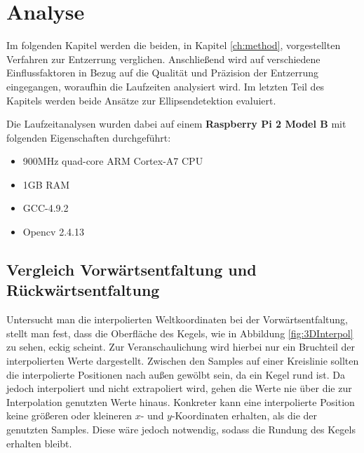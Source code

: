 \chapter{Analyse}
\label{ch:analysis}

Im folgenden Kapitel werden die beiden, in Kapitel \ref{ch:method}, vorgestellten Verfahren zur Entzerrung verglichen. Anschließend wird auf verschiedene Einflussfaktoren in Bezug auf die Qualität und Präzision der Entzerrung eingegangen, woraufhin die Laufzeiten analysiert wird. Im letzten Teil des Kapitels werden beide Ansätze zur Ellipsendetektion evaluiert.


Die Laufzeitanalysen wurden dabei auf einem \textbf{Raspberry Pi 2 Model B} mit folgenden Eigenschaften durchgeführt:
\begin{itemize}
	\item 900MHz quad-core ARM Cortex-A7 CPU
	\item 1GB RAM
	\item GCC-4.9.2
	\item Opencv 2.4.13
\end{itemize}


\section{Vergleich Vorwärtsentfaltung und Rückwärtsentfaltung}
Untersucht man die interpolierten Weltkoordinaten bei der Vorwärtsentfaltung, stellt man fest, dass die Oberfläche des Kegels,  wie in Abbildung \ref{fig:3DInterpol} zu sehen, eckig scheint. Zur Veranschaulichung wird hierbei nur ein Bruchteil der interpolierten Werte dargestellt. Zwischen den Samples auf einer Kreislinie sollten die interpolierte Positionen nach außen gewölbt sein, da ein Kegel rund ist. Da jedoch interpoliert und nicht extrapoliert wird, gehen die Werte nie über die zur Interpolation genutzten Werte hinaus. Konkreter kann eine interpolierte Position keine größeren oder kleineren $x$- und $y$-Koordinaten erhalten, als die der genutzten Samples. Diese wäre jedoch notwendig, sodass die Rundung des Kegels erhalten bleibt.

